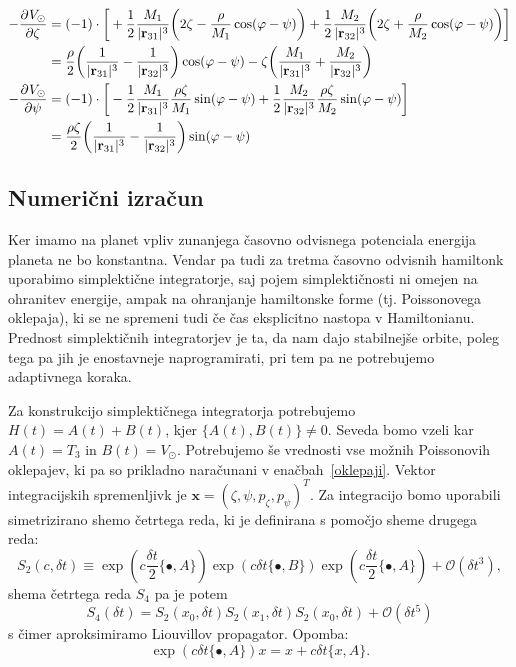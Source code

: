 \documentclass[12pt, a4paper]{article}
\renewcommand{\r}{
    \ensuremath{\mathbf{r}}
}
\newcommand{\sfrac}[2]{
    \ensuremath{\textstyle{\frac{#1}{#2}}}
}
\newcommand{\der}[3][]{
    \ensuremath{ \frac{\partial^{#1} #2}{\partial #3^{#1}} }
}
\begin{document}
\begin{align}
    -\der{V_\odot}{\zeta} &= (-1)\cdot\bigg[+\frac{1}{2}\frac{M_1}{|\r_{31}|^3}\bigg(2\zeta -
        \frac{\rho}{M_1}\cos(\varphi - \psi)\bigg) + \frac{1}{2}\frac{M_2}{|\r_{32}|^3}
        \bigg(2\zeta + \frac{\rho}{M_2}\cos(\varphi - \psi)\bigg)\bigg] \notag \\
    &= \frac{\rho}{2}\bigg(\frac{1}{|\r_{31}|^3} - \frac{1}{|\r_{32}|^3}\bigg)\cos(\varphi - \psi) -
        \zeta\bigg(\frac{M_1}{|\r_{31}|^3} + \frac{M_2}{|\r_{32}|^3}\bigg) \\
        -\der{V_\odot}{\psi} &= (-1)\cdot\bigg[-\frac{1}{2}\frac{M_1}{|\r_{31}|^3}\frac{\rho\zeta}{M_1}\sin(\varphi - \psi)
        + \frac{1}{2}\frac{M_2}{|\r_{32}|^3}\frac{\rho\zeta}{M_2}\sin(\varphi - \psi) \bigg] \notag \\
    &= \frac{\rho\zeta}{2}\bigg(\frac{1}{|\r_{31}|^3} - \frac{1}{|\r_{32}|^3}\bigg)\sin(\varphi - \psi)
\end{align}

\subsection{Numeri\v cni izra\v cun}
Ker imamo na planet vpliv zunanjega \v casovno odvisnega potenciala energija planeta ne bo konstantna. Vendar pa
tudi za tretma \v casovno odvisnih hamiltonk uporabimo simplekti\v cne integratorje, saj pojem simplekti\v cnosti
ni omejen na ohranitev energije, ampak na ohranjanje hamiltonske forme (tj. Poissonovega oklepaja), ki se ne
spremeni tudi \v ce \v cas eksplicitno nastopa v Hamiltonianu. Prednost simplekti\v cnih integratorjev je ta, da
nam dajo stabilnej\v se orbite, poleg tega pa jih je enostavneje naprogramirati, pri tem pa ne potrebujemo
adaptivnega koraka.

Za konstrukcijo simplekti\v cnega integratorja potrebujemo $H(t) = A(t) + B(t)$, kjer $\{A(t), B(t)\} \neq 0$.
Seveda bomo vzeli kar $A(t) = T_3$ in $B(t) = V_\odot$. Potrebujemo \v se vrednosti vse mo\v znih Poissonovih
oklepajev, ki pa so prikladno nara\v cunani v ena\v cbah~\eqref{oklepaji}. Vektor integracijskih spremenljivk
je $\mathbf{x} = (\zeta, \psi, p_\zeta, p_\psi)^T$. Za integracijo bomo uporabili simetrizirano shemo
\v cetrtega reda, ki je definirana s pomo\v cjo sheme drugega reda:
\[
    S_2(c,\delta t) \equiv \exp(c\sfrac{\delta t}{2}\{\bullet, A\})\exp(c\delta t\{\bullet, B\})
    \exp(c\sfrac{\delta t}{2}\{\bullet, A\}) + \mathcal{O}(\delta t^3),
\]
shema \v cetrtega reda $S_4$ pa je potem
\begin{equation}
    S_4(\delta t) = S_2(x_0, \delta t) S_2 (x_1, \delta t) S_2 (x_0, \delta t) + \mathcal{O}(\delta t^5)
\end{equation}
s \v cimer aproksimiramo Liouvillov propagator. Opomba:
\[
    \exp(c\delta t\{\bullet, A\})x = x + c\delta t\{x, A\}.
\]
\end{document}
